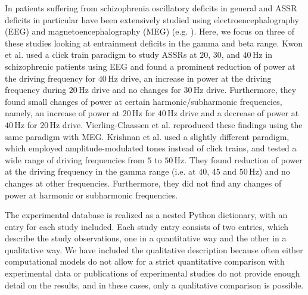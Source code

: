 \documentclass[CompPsych]{stjour}
\begin{document}
In patients suffering from schizophrenia oscillatory deficits in general and ASSR deficits in particular have been extensively studied using electroencephalography (EEG) and 
magnetoencephalography (MEG) 
(e.g.  \cite{Kwon1999,Vierling2008,Krishnan2009,
Light2006,Zhang2016,Hamm2015,Brenner2003,Spencer2009b,Spencer2008,Spencer2012,OConnell2015, Mulert2011}). Here, we focus on three of these studies looking at
entrainment deficits in the gamma and beta range. Kwon et al. \cite{Kwon1999} used a click train paradigm to study ASSRs at $20$, $30$, and $40$\,Hz in schizophrenic
patients using EEG and found a prominent reduction of power at the driving frequency for $40$\,Hz drive, an increase in power at the driving frequency during $20$\,Hz drive and 
no changes for $30$\,Hz drive. Furthermore, they found small changes of power at certain harmonic/subharmonic frequencies, namely, an increase of power at $20$\,Hz for $40$\,Hz
drive and a decrease of power at $40$\,Hz for $20$\,Hz drive. Vierling-Claassen et al. \cite{Vierling2008} reproduced these findings using the same paradigm with MEG. 
Krishnan et al. \cite{Krishnan2009} used a slightly different paradigm, which employed amplitude-modulated tones instead of click trains, and tested a wide range of driving 
frequencies from $5$ to $50$\,Hz. They found reduction of power at the driving frequency in the gamma range (i.e. at $40$, $45$ and $50$\,Hz) and no changes at other frequencies.
Furthermore, they did not find any changes of power at harmonic or subharmonic frequencies. 

The experimental database is realized as a nested Python dictionary, with an entry for each study included.
Each study entry consists of two entries, which describe the study observations, one in a quantitative way and the other in a qualitative way.
We have included the qualitative description because often either computational models do not allow for a strict quantitative comparison with 
experimental data or publications of experimental studies do not provide enough detail on the results, and in these cases, only a qualitative comparison is possible. 
\end{document}
